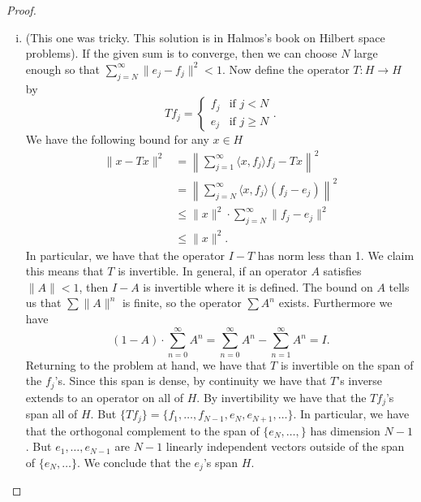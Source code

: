 \documentclass[11pt,letterpaper]{report}
\begin{document}
\begin{proof}
\begin{enumerate}[(i)]
		\item (This one was tricky. This solution is in Halmos's book on Hilbert space problems). If the given sum is to converge, then we can choose $N$ large enough so that $\sum_{j=N}^\infty \|e_j-f_j\|^2<1$. Now define the operator $T: H\to H$ by
		\[
		Tf_j = \begin{cases}
			f_j &\text{if }j<N\\
			e_j &\text{if }j\geq N
		\end{cases}.
		\]
		We have the following bound for any $x\in H$
		\begin{align*}
			\|x - Tx\|^2 &= \left\|\sum_{j=1}^\infty \langle x, f_j\rangle f_j - Tx\right\|^2\\
			&= \left\|\sum_{j=N}^\infty \langle x, f_j\rangle (f_j-e_j)\right\|^2\\
			&\leq \|x\|^2 \cdot \sum_{j=N}^\infty\|f_j-e_j\|^2\\
			&\leq \|x\|^2.
		\end{align*}
		In particular, we have that the operator $I-T$ has norm less than 1. We claim this means that $T$ is invertible. In general, if an operator $A$ satisfies $\|A\|<1$, then $I-A$ is invertible where it is defined. The bound on $A$ tells us that $\sum \|A\|^n$ is finite, so the operator $\sum A^n$ exists. Furthermore we have
		\[
		(1-A)\cdot \sum_{n=0}^\infty A^n = \sum_{n=0}^\infty A^n - \sum_{n=1}^\infty A^n = I.
		\]
		Returning to the problem at hand, we have that $T$ is invertible on the span of the $f_j$'s. Since this span is dense, by continuity we have that $T$'s inverse extends to an operator on all of $H$. By invertibility we have that the $Tf_j$'s span all of $H$. But $\{Tf_j\} = \{f_1, \ldots, f_{N-1}, e_N, e_{N+1}, \ldots\}$. In particular, we have that the orthogonal complement to the span of $\{e_N, \ldots, \}$ has dimension $N-1$. But $e_1, \ldots, e_{N-1}$ are $N-1$ linearly independent vectors outside of the span of $\{e_N, \ldots\}$. We conclude that the $e_j$'s span $H$.
	\end{enumerate}
\end{proof}
\end{document}
